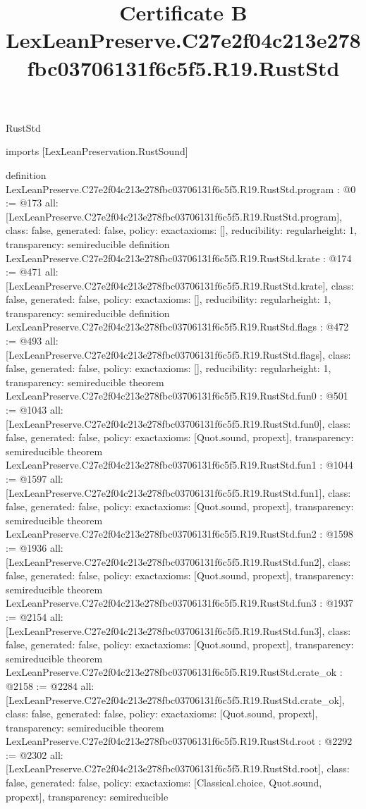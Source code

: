\begin{lexlean}{RustStd}
\title{Certificate B LexLeanPreserve.C27e2f04c213e278fbc03706131f6c5f5.R19.RustStd}
\begin{coremodule}
imports [LexLeanPreservation.RustSound]

definition LexLeanPreserve.C27e2f04c213e278fbc03706131f6c5f5.R19.RustStd.program : @0 := @173 {
  all: [LexLeanPreserve.C27e2f04c213e278fbc03706131f6c5f5.R19.RustStd.program],
  class: false,
  generated: false,
  policy: exact{axioms: []},
  reducibility: regular{height: 1},
  transparency: semireducible
}
definition LexLeanPreserve.C27e2f04c213e278fbc03706131f6c5f5.R19.RustStd.krate : @174 := @471 {
  all: [LexLeanPreserve.C27e2f04c213e278fbc03706131f6c5f5.R19.RustStd.krate],
  class: false,
  generated: false,
  policy: exact{axioms: []},
  reducibility: regular{height: 1},
  transparency: semireducible
}
definition LexLeanPreserve.C27e2f04c213e278fbc03706131f6c5f5.R19.RustStd.flags : @472 := @493 {
  all: [LexLeanPreserve.C27e2f04c213e278fbc03706131f6c5f5.R19.RustStd.flags],
  class: false,
  generated: false,
  policy: exact{axioms: []},
  reducibility: regular{height: 1},
  transparency: semireducible
}
theorem LexLeanPreserve.C27e2f04c213e278fbc03706131f6c5f5.R19.RustStd.fun0 : @501 := @1043 {
  all: [LexLeanPreserve.C27e2f04c213e278fbc03706131f6c5f5.R19.RustStd.fun0],
  class: false,
  generated: false,
  policy: exact{axioms: [Quot.sound, propext]},
  transparency: semireducible
}
theorem LexLeanPreserve.C27e2f04c213e278fbc03706131f6c5f5.R19.RustStd.fun1 : @1044 := @1597 {
  all: [LexLeanPreserve.C27e2f04c213e278fbc03706131f6c5f5.R19.RustStd.fun1],
  class: false,
  generated: false,
  policy: exact{axioms: [Quot.sound, propext]},
  transparency: semireducible
}
theorem LexLeanPreserve.C27e2f04c213e278fbc03706131f6c5f5.R19.RustStd.fun2 : @1598 := @1936 {
  all: [LexLeanPreserve.C27e2f04c213e278fbc03706131f6c5f5.R19.RustStd.fun2],
  class: false,
  generated: false,
  policy: exact{axioms: [Quot.sound, propext]},
  transparency: semireducible
}
theorem LexLeanPreserve.C27e2f04c213e278fbc03706131f6c5f5.R19.RustStd.fun3 : @1937 := @2154 {
  all: [LexLeanPreserve.C27e2f04c213e278fbc03706131f6c5f5.R19.RustStd.fun3],
  class: false,
  generated: false,
  policy: exact{axioms: [Quot.sound, propext]},
  transparency: semireducible
}
theorem LexLeanPreserve.C27e2f04c213e278fbc03706131f6c5f5.R19.RustStd.crate_ok : @2158 := @2284 {
  all: [LexLeanPreserve.C27e2f04c213e278fbc03706131f6c5f5.R19.RustStd.crate_ok],
  class: false,
  generated: false,
  policy: exact{axioms: [Quot.sound, propext]},
  transparency: semireducible
}
theorem LexLeanPreserve.C27e2f04c213e278fbc03706131f6c5f5.R19.RustStd.root : @2292 := @2302 {
  all: [LexLeanPreserve.C27e2f04c213e278fbc03706131f6c5f5.R19.RustStd.root],
  class: false,
  generated: false,
  policy: exact{axioms: [Classical.choice, Quot.sound, propext]},
  transparency: semireducible
}


\end{coremodule}
\end{lexlean}
